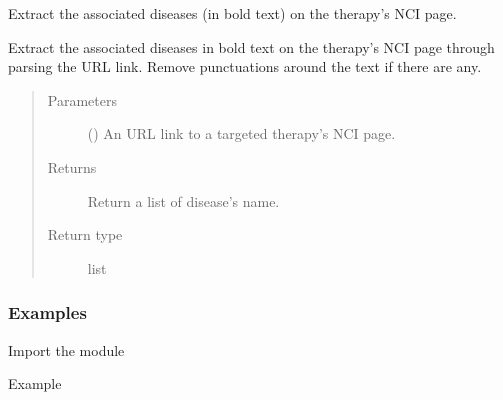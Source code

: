 \documentclass[letterpaper,10pt,english]{sphinxmanual}
\begin{document}
\begin{fulllineitems}
\label{\detokenize{biomarker_extraction:biomarker_extraction.therapy_disease}}
\sphinxAtStartPar
Extract the associated diseases (in bold text) on the therapy’s NCI page.

\sphinxAtStartPar
Extract the associated diseases in bold text on the therapy’s NCI page through parsing the URL link. Remove punctuations around the text if there are any.
\begin{quote}\begin{description}
\item[{Parameters}] \leavevmode
\sphinxAtStartPar
{} () \textendash{} An URL link to a targeted therapy’s NCI page.

\item[{Returns}] \leavevmode
\sphinxAtStartPar
Return a list of disease’s name.

\item[{Return type}] \leavevmode
\sphinxAtStartPar
list

\end{description}\end{quote}
\subsubsection*{Examples}

\sphinxAtStartPar
Import the module

\begin{sphinxVerbatim}[commandchars=\\\{\}]
   
\end{sphinxVerbatim}

\sphinxAtStartPar
Example

\begin{sphinxVerbatim}[commandchars=\\\{\}]
  
  
\end{sphinxVerbatim}

\end{fulllineitems}
\end{document}
